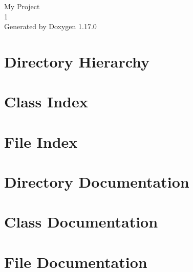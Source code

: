 \documentclass[twoside]{book}
\newcommand{\+}{\discretionary{\mbox{\scriptsize$\hookleftarrow$}}{}{}}
\newcommand{\clearemptydoublepage}{%
    \newpage{\pagestyle{empty}\cleardoublepage}%
  }
\begin{document}
  \raggedbottom
    \hypersetup{pageanchor=false,
                bookmarksnumbered=true,
                pdfencoding=unicode
               }
  \begin{titlepage}
  \vspace*{7cm}
  \begin{center}%
  {\Large My Project}\\
  [1ex]\large 1 \\
  \vspace*{1cm}
  {\large Generated by Doxygen 1.17.0}\\
  \end{center}
  \end{titlepage}
  \clearemptydoublepage
  \tableofcontents
  \clearemptydoublepage
  \hypersetup{pageanchor=true}
\chapter{Directory Hierarchy}

\chapter{Class Index}

\chapter{File Index}

\chapter{Directory Documentation}

\chapter{Class Documentation}

\chapter{File Documentation}

  \backmatter
  \newpage
  \clearemptydoublepage
  \printindex
\end{document}
